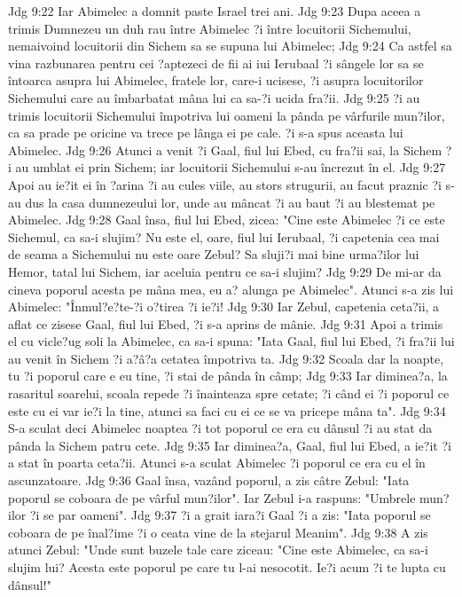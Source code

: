 Jdg 9:22  Iar Abimelec a domnit paste Israel trei ani.
Jdg 9:23  Dupa aceea a trimis Dumnezeu un duh rau între Abimelec ?i între locuitorii Sichemului, nemaivoind locuitorii din Sichem sa se supuna lui Abimelec;
Jdg 9:24  Ca astfel sa vina razbunarea pentru cei ?aptezeci de fii ai iui Ierubaal ?i sângele lor sa se întoarca asupra lui Abimelec, fratele lor, care-i ucisese, ?i asupra locuitorilor Sichemului care au îmbarbatat mâna lui ca sa-?i ucida fra?ii.
Jdg 9:25  ?i au trimis locuitorii Sichemului împotriva lui oameni la pânda pe vârfurile mun?ilor, ca sa prade pe oricine va trece pe lânga ei pe cale. ?i s-a spus aceasta lui Abimelec.
Jdg 9:26  Atunci a venit ?i Gaal, fiul lui Ebed, cu fra?ii sai, la Sichem ?i au umblat ei prin Sichem; iar locuitorii Sichemului s-au încrezut în el.
Jdg 9:27  Apoi au ie?it ei în ?arina ?i au cules viile, au stors strugurii, au facut praznic ?i s-au dus la casa dumnezeului lor, unde au mâncat ?i au baut ?i au blestemat pe Abimelec.
Jdg 9:28  Gaal însa, fiul lui Ebed, zicea: "Cine este Abimelec ?i ce este Sichemul, ca sa-i slujim? Nu este el, oare, fiul lui Ierubaal, ?i capetenia cea mai de seama a Sichemului nu este oare Zebul? Sa sluji?i mai bine urma?ilor lui Hemor, tatal lui Sichem, iar aceluia pentru ce sa-i slujim?
Jdg 9:29  De mi-ar da cineva poporul acesta pe mâna mea, eu a? alunga pe Abimelec". Atunci s-a zis lui Abimelec: "Înmul?e?te-?i o?tirea ?i ie?i!
Jdg 9:30  Iar Zebul, capetenia ceta?ii, a aflat ce zisese Gaal, fiul lui Ebed, ?i s-a aprins de mânie.
Jdg 9:31  Apoi a trimis el cu vicle?ug soli la Abimelec, ca sa-i spuna: "Iata Gaal, fiul lui Ebed, ?i fra?ii lui au venit în Sichem ?i a?â?a cetatea împotriva ta.
Jdg 9:32  Scoala dar la noapte, tu ?i poporul care e eu tine, ?i stai de pânda în câmp;
Jdg 9:33  Iar diminea?a, la rasaritul soarelui, scoala repede ?i înainteaza spre cetate; ?i când ei ?i poporul ce este cu ei var ie?i la tine, atunci sa faci cu ei ce se va pricepe mâna ta".
Jdg 9:34  S-a sculat deci Abimelec noaptea ?i tot poporul ce era cu dânsul ?i au stat da pânda la Sichem patru cete.
Jdg 9:35  Iar diminea?a, Gaal, fiul lui Ebed, a ie?it ?i a stat în poarta ceta?ii. Atunci s-a sculat Abimelec ?i poporul ce era cu el în ascunzatoare.
Jdg 9:36  Gaal însa, vazând poporul, a zis câtre Zebul: "Iata poporul se coboara de pe vârful mun?ilor". Iar Zebul i-a raspuns: "Umbrele mun?ilor ?i se par oameni".
Jdg 9:37  ?i a grait iara?i Gaal ?i a zis: "Iata poporul se coboara de pe înal?ime ?i o ceata vine de la stejarul Meanim".
Jdg 9:38  A zis atunci Zebul: "Unde sunt buzele tale care ziceau: "Cine este Abimelec, ca sa-i slujim lui? Acesta este poporul pe care tu l-ai nesocotit. Ie?i acum ?i te lupta cu dânsul!"
